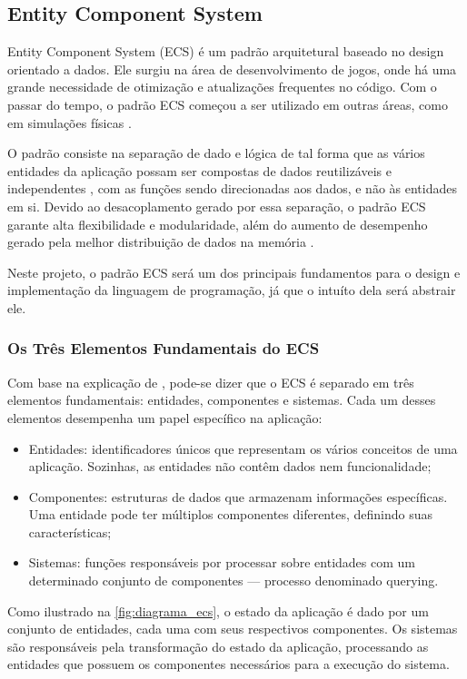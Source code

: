 \subsection{Entity Component System}

Entity Component System (ECS) é um padrão arquitetural baseado no design orientado a dados. Ele surgiu na área de desenvolvimento de jogos, onde há uma grande necessidade de otimização e atualizações frequentes no código. Com o passar do tempo, o padrão ECS começou a ser utilizado em outras áreas, como em simulações físicas \cite{flightdynamics}.

O padrão consiste na separação de dado e lógica de tal forma que as vários entidades da aplicação possam ser compostas de dados reutilizáveis e independentes \cite{ecsfaq}, com as funções sendo direcionadas aos dados, e não às entidades em si. Devido ao desacoplamento gerado por essa separação, o padrão ECS garante alta flexibilidade e modularidade, além do aumento de desempenho gerado pela melhor distribuição de dados na memória \cite{ecsstorageinpics}.

Neste projeto, o padrão ECS será um dos principais fundamentos para o design e implementação da linguagem de programação, já que o intuíto dela será abstrair ele.

\subsubsection{Os Três Elementos Fundamentais do ECS}

Com base na explicação de \textcite{ecsfaq}, pode-se dizer que o ECS é separado em três elementos fundamentais: entidades, componentes e sistemas. Cada um desses elementos desempenha um papel específico na aplicação:

\begin{itemize}
    \item Entidades: identificadores únicos que representam os vários conceitos de uma aplicação. Sozinhas, as entidades não contêm dados nem funcionalidade;
    \item Componentes: estruturas de dados que armazenam informações específicas. Uma entidade pode ter múltiplos componentes diferentes, definindo suas características;
    \item Sistemas: funções responsáveis por processar sobre entidades com um determinado conjunto de componentes — processo denominado querying.
\end{itemize}

Como ilustrado na \autoref{fig:diagrama_ecs}, o estado da aplicação é dado por um conjunto de entidades, cada uma com seus respectivos componentes. Os sistemas são responsáveis pela transformação do estado da aplicação, processando as entidades que possuem os componentes necessários para a execução do sistema.

